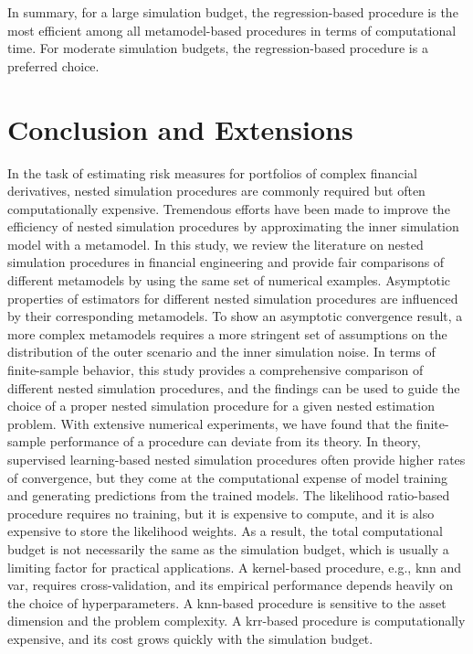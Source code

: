 In summary, for a large simulation budget, the regression-based procedure is the most efficient among all metamodel-based procedures in terms of computational time.
For moderate simulation budgets, the regression-based procedure is a preferred choice.

\section{Conclusion and Extensions}\label{sec1:conclusion}
In the task of estimating risk measures for portfolios of complex financial derivatives, nested simulation procedures are commonly required but often computationally expensive. 
Tremendous efforts have been made to improve the efficiency of nested simulation procedures by approximating the inner simulation model with a metamodel. 
In this study, we review the literature on nested simulation procedures in financial engineering and provide fair comparisons of different metamodels by using the same set of numerical examples. 
Asymptotic properties of estimators for different nested simulation procedures are influenced by their corresponding metamodels.
To show an asymptotic convergence result, a more complex metamodels requires a more stringent set of assumptions on the distribution of the outer scenario and the inner simulation noise.
In terms of finite-sample behavior, this study provides a comprehensive comparison of different nested simulation procedures, and the findings can be used to guide the choice of a proper nested simulation procedure for a given nested estimation problem.
With extensive numerical experiments, we have found that the finite-sample performance of a procedure can deviate from its theory. 
In theory, supervised learning-based nested simulation procedures often provide higher rates of convergence, but they come at the computational expense of model training and generating predictions from the trained models. 
The likelihood ratio-based procedure requires no training, but it is expensive to compute, and it is also expensive to store the likelihood weights.
As a result, the total computational budget is not necessarily the same as the simulation budget, which is usually a limiting factor for practical applications.
A kernel-based procedure, e.g., \gls{knn} and \gls{var}, requires cross-validation, and its empirical performance depends heavily on the choice of hyperparameters.
A \gls{knn}-based procedure is sensitive to the asset dimension and the problem complexity.
A \gls{krr}-based procedure is computationally expensive, and its cost grows quickly with the simulation budget.
